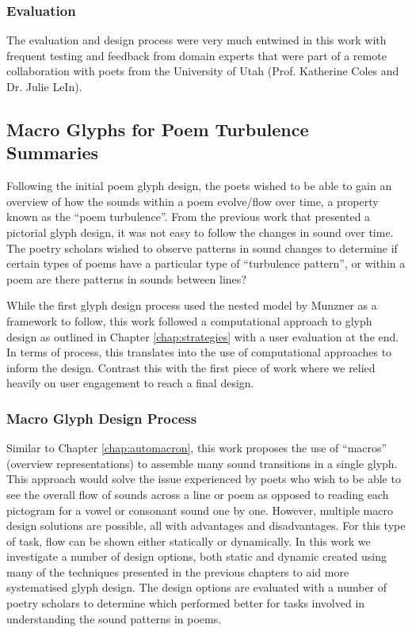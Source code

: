 \subsubsection{Evaluation}
The evaluation and design process were very much entwined in this work with frequent testing and feedback from domain experts that were part of a remote collaboration with poets from the University of Utah (Prof. Katherine Coles and Dr. Julie LeIn).


\subsection{Macro Glyphs for Poem Turbulence Summaries}

Following the initial poem glyph design, the poets wished to be able to gain an overview of how the sounds within a poem evolve/flow over time, a property known as the ``poem turbulence''.
From the previous work that presented a pictorial glyph design, it was not easy to follow the changes in sound over time.
The poetry scholars wished to observe patterns in sound changes to determine if certain types of poems have a particular type of ``turbulence pattern'', or within a poem are there patterns in sounds between lines?

While the first glyph design process used the nested model by Munzner \cite{munzner2009nested} as a framework to follow, this work followed a computational approach to glyph design as outlined in Chapter \ref{chap:strategies} with a user evaluation at the end.
In terms of process, this translates into the use of computational approaches to inform the design. Contrast this with the first piece of work where we relied heavily on user engagement to reach a final design.

\subsubsection{Macro Glyph Design Process}

Similar to Chapter \ref{chap:automacron}, this work proposes the use of ``macros'' (overview representations) to assemble many sound transitions in a single glyph.
This approach would solve the issue experienced by poets who wish to be able to see the overall flow of sounds across a line or poem as opposed to reading each pictogram for a vowel or consonant sound one by one.  
However, multiple macro design solutions are possible, all with advantages and disadvantages.
For this type of task, flow can be shown either statically or dynamically.
In this work we investigate a number of design options, both static and dynamic created using many of the techniques presented in the previous chapters to aid more systematised glyph design. 
The design options are evaluated with a number of poetry scholars to determine which performed better for tasks involved in understanding the sound patterns in poems.  

